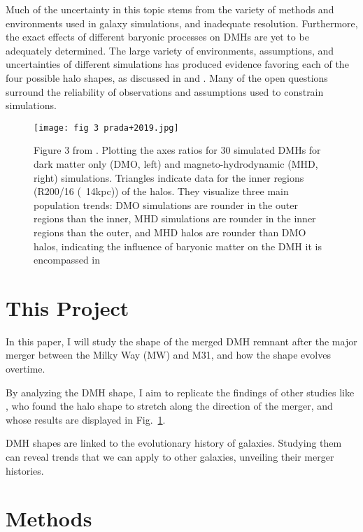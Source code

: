 \documentclass[fleqn,usenatbib]{mnras}
\begin{document}
Much of the uncertainty in this topic stems from the variety of methods and environments used in galaxy simulations, and inadequate resolution. Furthermore, the exact effects of different baryonic processes on DMHs are yet to be adequately determined. The large variety of environments, assumptions, and uncertainties of different simulations has produced evidence favoring each of the four possible halo shapes, as discussed in \citet{Chua_2019} and \citet{Prada_2019}. Many of the open questions surround the reliability of observations and assumptions used to constrain simulations.

\begin{figure}
	\texttt{[image: fig 3 prada+2019.jpg]}
    \caption{Figure 3 from \citet{Prada_2019}. Plotting the axes ratios for 30 simulated DMHs for dark matter only (DMO, left) and magneto-hydrodynamic (MHD, right) simulations. Triangles indicate data for the inner regions (R200/16 (~14kpc)) of the halos. They visualize three main population trends: DMO simulations are rounder in the outer regions than the inner, MHD simulations are rounder in the inner regions than the outer, and MHD halos are rounder than DMO halos, indicating the influence of baryonic matter on the DMH it is encompassed in}
    \label{fig:MHD vs DMO}
\end{figure}


\section{This Project}

In this paper, I will study the shape of the merged DMH remnant after the major merger between the Milky Way (MW) and M31, and how the shape evolves overtime.  

By analyzing the DMH shape, I aim to replicate the findings of other studies like \citet{Drakos_2019}, who found the halo shape to stretch along the direction of the merger, and \citet{Prada_2019} whose results are displayed in Fig.~\ref{fig:MHD vs DMO}.

DMH shapes are linked to the evolutionary history of galaxies. Studying them can reveal trends that we can apply to other galaxies, unveiling their merger histories.



\section{Methods}
\end{document}
